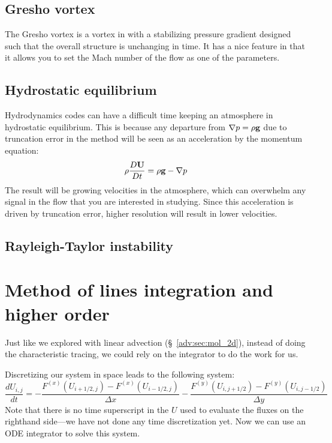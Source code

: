 \subsection{Gresho vortex}

The Gresho vortex is a vortex in with a stabilizing pressure gradient
designed such that the overall structure is unchanging in time.  It
has a nice feature in that it allows you to set the Mach number of
the flow as one of the parameters.


\subsection{Hydrostatic equilibrium}

Hydrodynamics codes can have a difficult time keeping an atmosphere in
hydrostatic equilibrium.  This is because any departure from $\nabla p
= \rho {\bf g}$ due to truncation error in the method will be seen as an
acceleration by the momentum equation:
\begin{equation}
\rho {\frac{{D{\bf U}}}{D t}} = \rho {\bf g} - \nabla p
\end{equation}
The result will be growing velocities in the atmosphere, which can
overwhelm any signal in the flow that you are interested in studying.
Since this acceleration is driven by truncation error, higher
resolution will result in lower velocities.




\subsection{Rayleigh-Taylor instability}



\section{Method of lines integration and higher order}

Just like we explored with linear advection (\S~\ref{adv:sec:mol_2d}),
instead of doing the characteristic tracing, we could rely on the
integrator to do the work for us.


Discretizing our system in space leads to the following system:
\begin{equation}
\frac{dU_{i,j}}{dt} = -\frac{F^{(x)}(U_{i+1/2,j}) - F^{(x)}(U_{i-1/2,j})}{\Delta x}
                      -\frac{F^{(y)}(U_{i,j+1/2}) - F^{(y)}(U_{i,j-1/2})}{\Delta y}
\end{equation}
Note that there is no time superscript in the $U$ used to evaluate the
fluxes on the righthand side---we have not done any time
discretization yet.  Now we can use an ODE integrator to solve this system.

